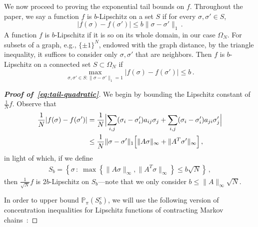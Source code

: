 \documentclass[reqno,11pt]{amsart}
\numberwithin{equation}{section}
\theoremstyle{definition}{
\newtheorem{example}[theorem]{Example}
\newtheorem{definition}[theorem]{Definition}
\newtheorem*{definition*}{Definition}
\newtheorem{problem}[theorem]{Problem}
\newtheorem{question}[theorem]{Question}
\newtheorem{remark}[theorem]{Remark}
}
\renewcommand{\P}{\mathbb P}
\begin{document}
We now proceed to proving the exponential tail bounds on $f$.
Throughout the paper, we say a function $f$ is $b$-Lipschitz on a set $S$ if for every $\sigma, \sigma'\in  S$, 
\[|f(\sigma)-f(\sigma')| \leq b \|\sigma-\sigma'\|_1\,.
\]
A function $f$ is $b$-Lipschitz if it is so on its whole domain, in our case $\Omega_N$. 
For subsets of a graph, e.g., $\{\pm 1\}^N$, endowed with the graph distance, by the triangle inequality, it suffices to consider only $\sigma, \sigma'$ that are neighbors. Then $f$ is $b$-Lipschitz on a connected set $S\subset \Omega_N$ if 
\[\max_{\sigma,\sigma'\in S:\|\sigma-\sigma'\|_1=1} |f(\sigma)-f(\sigma')| \leq b\,.
\]

\begin{proof}[\textbf{\emph{Proof of~\eqref{eq:tail-quadratic}}}]
We begin by bounding the Lipschitz constant of $\frac 1N f$.
Observe that
\begin{align*}  
\frac 1N |f(\sigma)-f(\sigma')| & = \frac 1N \Bigl| \sum_{i,j} (\sigma_i-\sigma'_i)a_{ij} \sigma_j+ \sum_{i,j} (\sigma_i -\sigma'_i) a_{ji} \sigma'_j\Bigr| \\ 
& \leq \frac 1N \|\sigma-\sigma'\|_1 \Big[ \|A\sigma\|_\infty + \|A^T \sigma'\|_\infty\Big]\,,
\end{align*}
in light of which, if we define
\begin{align}\label{eq:good-set}
S_b= \left \{\sigma\,:\;   \max \left\{ \|A\sigma\|_\infty ,\|A^T \sigma\|_\infty \right\}\leq b\sqrt N\right \}\,,
\end{align}
then $\frac1{\sqrt{N}}f $ is $2b$-Lipschitz on $S_b$---note that we only consider $b\leq \|A\|_\infty \sqrt N$. 

In order to upper bound $\P_\pi(S_b^c)$, we will use the following version of concentration inequalities for Lipschitz functions of contracting Markov chains~\cite{Luczak08}:


\end{proof}
\end{document}
